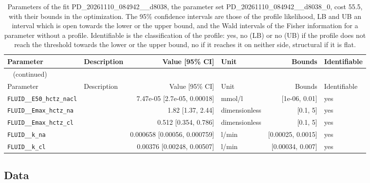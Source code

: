 \begin{longtable}{llrlrl}
\caption{Parameters of the fit PD\_20261110\_084942\_\_d8038, the parameter set PD\_20261110\_084942\_\_d8038\_0, cost 55.5, with their bounds in the optimization. The 95\% confidence intervals are those of the profile likelihood, LB and UB an interval which is open towards the lower or the upper bound, and the Wald intervals of the Fisher information for a parameter without a profile. Identifiable is the classification of the profile: yes, no (LB) or no (UB) if the profile does not reach the threshold towards the lower or the upper bound, no if it reaches it on neither side, structural if it is flat.}\label{tab:parameters:PD_20261110_084942__d8038} \\
\toprule
Parameter & Description & Value [95\% CI] & Unit & Bounds & Identifiable \\
\midrule
\endfirsthead
\multicolumn{6}{l}{\small\tablename~\thetable{} (continued)} \\
\toprule
Parameter & Description & Value [95\% CI] & Unit & Bounds & Identifiable \\
\midrule
\endhead
\bottomrule
\endlastfoot
\texttt{FLUID\_\_E50\_hctz\_nacl} &  & 7.47e-05 [2.7e-05, 0.00018] & mmol/l & [1e-06, 0.01] & yes \\
\texttt{FLUID\_\_Emax\_hctz\_na} &  & 1.82 [1.37, 2.44] & dimensionless & [0.1, 5] & yes \\
\texttt{FLUID\_\_Emax\_hctz\_cl} &  & 0.512 [0.354, 0.786] & dimensionless & [0.1, 5] & yes \\
\texttt{FLUID\_\_k\_na} &  & 0.000658 [0.00056, 0.000759] & l/min & [0.00025, 0.0015] & yes \\
\texttt{FLUID\_\_k\_cl} &  & 0.00376 [0.00248, 0.00507] & l/min & [0.00034, 0.007] & yes \\
\end{longtable}

\subsection{Data}

